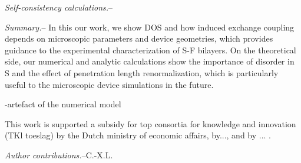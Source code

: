 \documentclass[aps,prl,twocolumn,superscriptaddress,showpacs,longbibliography]{revtex4-1}
\begin{document}
\emph{Self-consistency calculations.}--



\emph{Summary.}--
In this our work, we show DOS and how induced exchange coupling depends on microscopic parameters and device geometries, which provides guidance to the experimental characterization of S-F bilayers.
On the theoretical side, our numerical and analytic calculations show the importance of disorder in S and the effect of penetration length renormalization, which is particularly useful to the microscopic device simulations in the future.


-artefact of the numerical model

\begin{acknowledgements}
This work is supported a subsidy for top consortia for knowledge and innovation (TKl toeslag) by the Dutch ministry of economic affairs, by..., and by ... .
\end{acknowledgements}

\textit{Author contributions.}--C.-X.L. 








\end{document}
